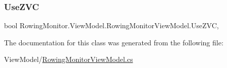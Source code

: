 \subsubsection{\texorpdfstring{Use\+Z\+VC}{UseZVC}}
{\footnotesize\ttfamily bool Rowing\+Monitor.\+View\+Model.\+Rowing\+Monitor\+View\+Model.\+Use\+Z\+VC\hspace{0.3cm}{\ttfamily [get]}, {\ttfamily [set]}}



The documentation for this class was generated from the following file\+:\begin{DoxyCompactItemize}
\item 
View\+Model/\hyperlink{_rowing_monitor_view_model_8cs}{Rowing\+Monitor\+View\+Model.\+cs}\end{DoxyCompactItemize}
